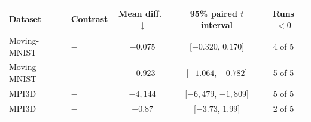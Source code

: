 \begin{tabular}{@{}llccc@{}}
\toprule
Dataset & Contrast & Mean diff.\ $\downarrow$ & 95\% paired $t$ interval & Runs $<0$ \\
\midrule
Moving-MNIST & \shvar{} $-$ \emavar{} & $-0.075$ & [$-0.320$, $0.170$] & 4 of 5 \\
Moving-MNIST & \shvar{} $-$ \shdet{} & $-0.923$ & [$-1.064$, $-0.782$] & 5 of 5 \\
\midrule
MPI3D & \shvar{} $-$ \emavar{} & $-4{,}144$ & [$-6{,}479$, $-1{,}809$] & 5 of 5 \\
MPI3D & \shvar{} $-$ \shdet{} & $-0.87$ & [$-3.73$, $1.99$] & 2 of 5 \\
\bottomrule
\end{tabular}
